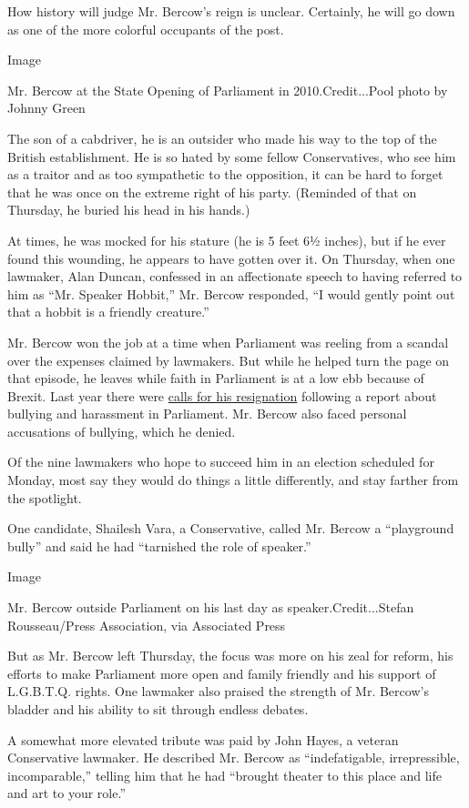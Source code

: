 How history will judge Mr. Bercow's reign is unclear. Certainly, he will
go down as one of the more colorful occupants of the post.

Image

Mr. Bercow at the State Opening of Parliament in 2010.Credit...Pool
photo by Johnny Green

The son of a cabdriver, he is an outsider who made his way to the top of
the British establishment. He is so hated by some fellow Conservatives,
who see him as a traitor and as too sympathetic to the opposition, it
can be hard to forget that he was once on the extreme right of his
party. (Reminded of that on Thursday, he buried his head in his hands.)

At times, he was mocked for his stature (he is 5 feet 6½ inches), but if
he ever found this wounding, he appears to have gotten over it. On
Thursday, when one lawmaker, Alan Duncan, confessed in an affectionate
speech to having referred to him as ``Mr. Speaker Hobbit,'' Mr. Bercow
responded, ``I would gently point out that a hobbit is a friendly
creature.''

Mr. Bercow won the job at a time when Parliament was reeling from a
scandal over the expenses claimed by lawmakers. But while he helped turn
the page on that episode, he leaves while faith in Parliament is at a
low ebb because of Brexit. Last year there were
\href{https://www.bbc.co.uk/news/uk-politics-45874284}{calls for his
resignation} following a report about bullying and harassment in
Parliament. Mr. Bercow also faced personal accusations of bullying,
which he denied.

Of the nine lawmakers who hope to succeed him in an election scheduled
for Monday, most say they would do things a little differently, and stay
farther from the spotlight.

One candidate, Shailesh Vara, a Conservative, called Mr. Bercow a
``playground bully'' and said he had ``tarnished the role of speaker.''

Image

Mr. Bercow outside Parliament on his last day as speaker.Credit...Stefan
Rousseau/Press Association, via Associated Press

But as Mr. Bercow left Thursday, the focus was more on his zeal for
reform, his efforts to make Parliament more open and family friendly and
his support of L.G.B.T.Q. rights. One lawmaker also praised the strength
of Mr. Bercow's bladder and his ability to sit through endless debates.

A somewhat more elevated tribute was paid by John Hayes, a veteran
Conservative lawmaker. He described Mr. Bercow as ``indefatigable,
irrepressible, incomparable,'' telling him that he had ``brought theater
to this place and life and art to your role.''

